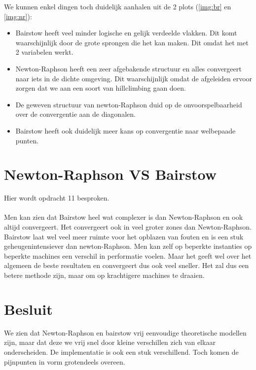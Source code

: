 \documentclass[a4paper,kulak]{kulakarticle}
\begin{document}
We kunnen enkel dingen toch duidelijk aanhalen uit de 2 plots (\ref{img:br}  en \ref{img:nr}):
\begin{itemize}
	\item Bairstow heeft veel minder logische en gelijk verdeelde vlakken. Dit komt waarschijnlijk door de grote sprongen die het kan maken. Dit omdat het met 2 variabelen werkt.
	\item Newton-Raphson heeft een zeer afgebakende structuur en alles convergeert naar iets in de dichte omgeving. Dit waarschijnlijk omdat de afgeleiden ervoor zorgen dat we aan een soort van hillclimbing gaan doen.
	\item De geweven structuur van newton-Raphson duid op de onvoorspelbaarheid over de convergentie aan de diagonalen.
	\item Bairstow heeft ook duidelijk meer kans op convergentie naar welbepaade punten.
\end{itemize}


\section{Newton-Raphson VS Bairstow}
Hier wordt opdracht 11 besproken.
\\~\\
Men kan zien dat Bairstow heel wat complexer is dan Newton-Raphson en ook altijd convergeert. Het convergeert ook in veel groter zones dan Newton-Raphson. Bairstow laat wel veel meer ruimte voor het opblazen van fouten en is een stuk geheugenintensiever dan newton-Raphson. Men kan zelf op beperkte instanties op beperkte machines een verschil in performatie voelen. Maar het geeft wel over het algemeen de beste resultaten en convergeert dus ook veel sneller. Het zal dus een betere methode zijn, maar om op krachtigere machines te draaien.

\section*{Besluit}

We zien dat Newton-Raphson en bairstow vrij eenvoudige theoretische modellen zijn, maar dat deze we vrij snel door kleine verschillen zich van elkaar onderscheiden. De implementatie is ook een stuk verschillend. Toch komen de pijnpunten in vorm grotendeels overeen.




\end{document}
